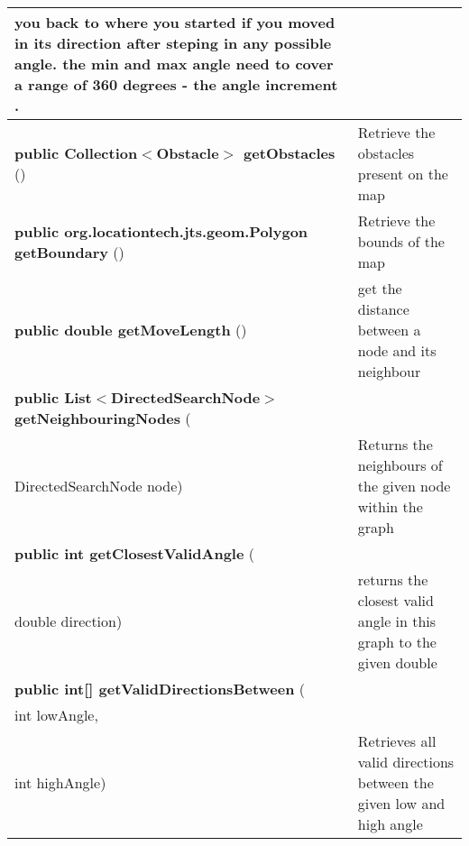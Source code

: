 {\begin{tabular}{ p{3in}|m{3.4in}}
 you back to where you started if you moved in its direction after steping in any possible angle.\newline%
 the min and max angle need to cover a range of 360 degrees {-} the angle increment .\\ \hline 
\textbf{public Collection$<$Obstacle$>$ getObstacles} () & Retrieve the obstacles present on the map\\ \hline 
\textbf{public org.locationtech.jts.geom.Polygon getBoundary} () & Retrieve the bounds of the map\\ \hline 
\textbf{public double getMoveLength} () & get the distance between a node and its neighbour\\ \hline 
\textbf{public List$<$DirectedSearchNode$>$ getNeighbouringNodes } (\\ \hspace*{ 5pt} DirectedSearchNode node) & Returns the neighbours of the given node within the graph\\ \hline 
\textbf{public int getClosestValidAngle } (\\ \hspace*{ 5pt} double direction) & returns the closest valid angle in this graph to the given double\\ \hline 
\textbf{public int{[}{]} getValidDirectionsBetween } (\\ \hspace*{ 5pt} int lowAngle,\\\hspace*{ 5pt} int highAngle) & Retrieves all valid directions between the given low and high angle\\ \hline 
\end{tabular}
}
